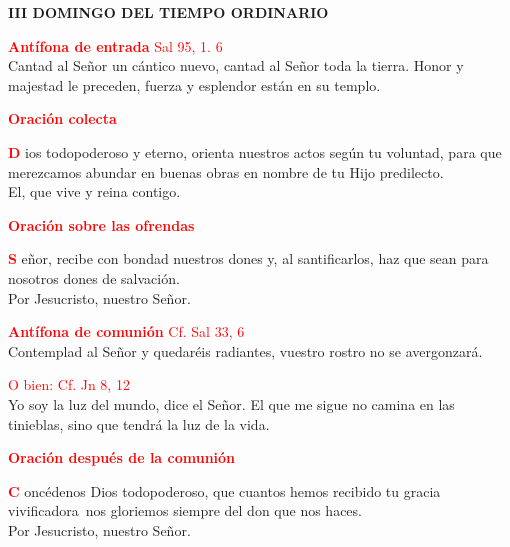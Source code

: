 \documentclass[12pt, letterpaper]{article}
\begin{document}

  \begin{center}
    \Huge {\bfseries III DOMINGO DEL TIEMPO ORDINARIO}
  \end{center}

  \Large {\textcolor{red}{ \textbf{Ant\'ifona de entrada} \hspace{1cm} Sal 95, 1. 6}}\\
  \Large {Cantad al Se\~nor un c\'antico nuevo, cantad al Se\~nor toda la tierra. Honor y majestad le preceden, fuerza y esplendor est\'an en su templo.}

  \Large {\bfseries \textcolor{red}{Oraci\'on colecta}}

  \lettrine[lines=2]{\bfseries \textcolor{red}{D}}{} \Large ios todopoderoso y eterno, orienta nuestros actos seg\'un tu voluntad, para que merezcamos abundar en buenas obras en nombre de tu Hijo predilecto.\\ 
  El, que vive y reina contigo.

  \Large {\bfseries \textcolor{red}{Oraci\'on sobre las ofrendas}}

  \lettrine[lines=2]{\bfseries \textcolor{red}{S}}{} \Large e\~nor, recibe con bondad nuestros dones y, al santificarlos, haz que sean para nosotros dones de salvaci\'on.\\
  Por Jesucristo, nuestro Se\~nor.

  \Large {\textcolor{red}{ \textbf{Ant\'ifona de comuni\'on} \hspace{1cm}  Cf. Sal 33, 6}}\\
  \Large {Contemplad al Se\~nor y quedar\'eis radiantes, vuestro rostro no se avergonzar\'a.}

  \Large {\textcolor{red}{O bien: \hspace{1cm}  Cf. Jn 8, 12}}\\
  \Large {Yo soy la luz del mundo, dice el Se\~nor. El que me sigue no camina en las tinieblas, sino que tendr\'a la luz de la vida.}

  \Large {\bfseries \textcolor{red}{Oraci\'on despu\'es de la comuni\'on}}
  
  \lettrine[lines=2]{\bfseries \textcolor{red}{C}}{} \Large onc\'edenos Dios todopoderoso, que cuantos hemos recibido tu gracia vivificadora\ nos gloriemos siempre del don que nos haces.\\
  Por Jesucristo, nuestro Se\~nor.
\end{document}
